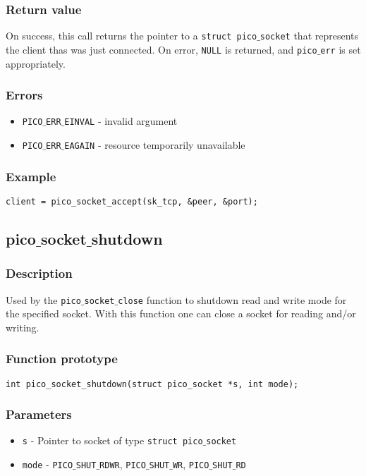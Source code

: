 \subsubsection*{Return value}
On success, this call returns the pointer to a \texttt{struct pico$\_$socket} that
represents the client thas was just connected. On error, \texttt{NULL} is returned,
and \texttt{pico$\_$err} is set appropriately.

\subsubsection*{Errors}
\begin{itemize}[noitemsep]
\item \texttt{PICO$\_$ERR$\_$EINVAL} - invalid argument
\item \texttt{PICO$\_$ERR$\_$EAGAIN} - resource temporarily unavailable
\end{itemize}

\subsubsection*{Example}
\begin{verbatim}
client = pico_socket_accept(sk_tcp, &peer, &port);
\end{verbatim}


\subsection{pico$\_$socket$\_$shutdown}

\subsubsection*{Description}
Used by the \texttt{pico$\_$socket$\_$close} function to shutdown read and write mode for
the specified socket. With this function one can close a socket for reading
and/or writing.

\subsubsection*{Function prototype}
\begin{verbatim}
int pico_socket_shutdown(struct pico_socket *s, int mode);
\end{verbatim}


\subsubsection*{Parameters}
\begin{itemize}[noitemsep]
\item \texttt{s} - Pointer to socket of type \texttt{struct pico$\_$socket}
\item \texttt{mode} - \texttt{PICO$\_$SHUT$\_$RDWR}, \texttt{PICO$\_$SHUT$\_$WR}, \texttt{PICO$\_$SHUT$\_$RD}
\end{itemize}

